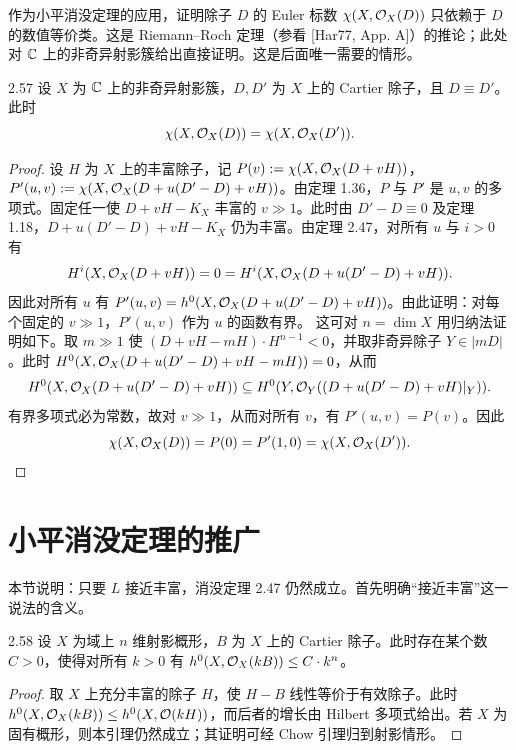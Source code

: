 作为小平消没定理的应用，证明除子 $D$ 的 Euler 标数 $\chi(X,\mathcal{O}_X(D))$ 只依赖于 $D$ 的数值等价类。这是 Riemann–Roch 定理（参看 [Har77, App. A]）的推论；此处对 $\mathbb{C}$ 上的非奇异射影簇给出直接证明。这是后面唯一需要的情形。

\begin{propositionp}{2.57}
设 $X$ 为 $\mathbb{C}$ 上的非奇异射影簇，$D,D'$ 为 $X$ 上的 Cartier 除子，且 $D\equiv D'$。此时
\[
\chi(X,\mathcal{O}_X(D))=\chi(X,\mathcal{O}_X(D')).
\]
\end{propositionp}

\begin{proof}
设 $H$ 为 $X$ 上的丰富除子，记 $P(v):=\chi(X,\mathcal{O}_X(D+vH))$，$P'(u,v):=\chi(X,\mathcal{O}_X(D+u(D'-D)+vH))$。由定理 1.36，$P$ 与 $P'$ 是 $u,v$ 的多项式。固定任一使 $D+vH-K_X$ 丰富的 $v\gg 1$。此时由 $D'-D\equiv 0$ 及定理 1.18，$D+u(D'-D)+vH-K_X$ 仍为丰富。由定理 2.47，对所有 $u$ 与 $i>0$ 有
\[
H^i(X,\mathcal{O}_X(D+vH))=0=H^i(X,\mathcal{O}_X(D+u(D'-D)+vH)).
\]
因此对所有 $u$ 有 $P'(u,v)=h^0(X,\mathcal{O}_X(D+u(D'-D)+vH))$。由此证明：对每个固定的 $v\gg 1$，$P'(u,v)$ 作为 $u$ 的函数有界。
这可对 $n=\dim X$ 用归纳法证明如下。取 $m\gg 1$ 使 $(D+vH-mH)\cdot H^{n-1}<0$，并取非奇异除子 $Y\in|mD|$。此时 $H^0(X,\mathcal{O}_X(D+u(D'-D)+vH-mH))=0$，从而
\[
H^0(X,\mathcal{O}_X(D+u(D'-D)+vH))\subseteq H^0(Y,\mathcal{O}_Y((D+u(D'-D)+vH)|_Y)).
\]
有界多项式必为常数，故对 $v\gg 1$，从而对所有 $v$，有 $P'(u,v)=P(v)$。因此
\[
\chi(X,\mathcal{O}_X(D))=P(0)=P'(1,0)=\chi(X,\mathcal{O}_X(D')).
\]
\end{proof}

\section{小平消没定理的推广}


本节说明：只要 $L$ 接近丰富，消没定理 2.47 仍然成立。首先明确“接近丰富”这一说法的含义。

\begin{lemmap}{2.58}
设 $X$ 为域上 $n$ 维射影概形，$B$ 为 $X$ 上的 Cartier 除子。此时存在某个数 $C>0$，使得对所有 $k>0$ 有 $h^0(X,\mathcal{O}_X(kB))\le C\cdot k^n$。
\end{lemmap}

\begin{proof}
取 $X$ 上充分丰富的除子 $H$，使 $H-B$ 线性等价于有效除子。此时 $h^0(X,\mathcal{O}_X(kB))\le h^0(X,\mathcal{O}(kH))$，而后者的增长由 Hilbert 多项式给出。若 $X$ 为固有概形，则本引理仍然成立；其证明可经 Chow 引理归到射影情形。
\end{proof}

